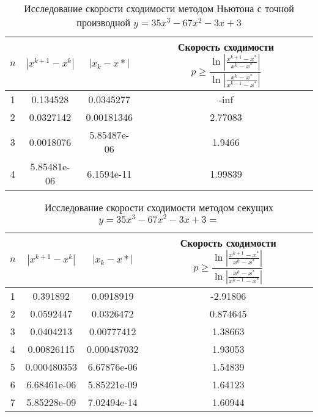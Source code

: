\documentclass{article}
\begin{document}
    \begin{table}[H]
        \centering
        \caption{Исследование скорости сходимости методом Ньютона с точной производной \mbox{$y = 35 x^3 - 67 x^2 -3x+3 $}}
        \begin{tabular}{|c|c|c|c|}
            \hline
            $n$ & $|x^{k+1} - x^k|$ & $ |x_k - x*|$ & Скорость сходимости $p \geqslant \dfrac{\ln | \frac{x^{k+1}-x^*}{x^k - x^*} |}{\ln |\frac{x^k -x^*}{x^{k-1} - x^*}|}$ \\
            \hline 
            1 & 0.134528 & 0.0345277 & -inf \\ \hline
            2 & 0.0327142 & 0.00181346 & 2.77083 \\ \hline
            3 & 0.0018076 & 5.85487e-06 & 1.9466 \\ \hline
            4 & 5.85481e-06 & 6.1594e-11 & 1.99839 \\ \hline
        \end{tabular}
    \end{table}
    \begin{table}[H]
        \centering
        \caption{Исследование скорости сходимости методом секущих \mbox{$y = 35 x^3 - 67 x^2 -3x+3 =$}}
        \begin{tabular}{|c|c|c|c|}
            \hline
            $n$ & $|x^{k+1} - x^k|$ & $ |x_k - x*|$ & Скорость сходимости $p \geqslant \dfrac{\ln | \frac{x^{k+1}-x^*}{x^k - x^*} |}{\ln |\frac{x^k -x^*}{x^{k-1} - x^*}|}$ \\
            \hline 
            1 & 0.391892 & 0.0918919 & -2.91806 \\ \hline
            2 & 0.0592447 & 0.0326472 & 0.874645 \\ \hline
            3 & 0.0404213 & 0.00777412 & 1.38663 \\ \hline
            4 & 0.00826115 & 0.000487032 & 1.93053 \\ \hline
            5 & 0.000480353 & 6.67876e-06 & 1.54839 \\ \hline
            6 & 6.68461e-06 & 5.85221e-09 & 1.64123 \\ \hline
            7 & 5.85228e-09 & 7.02494e-14 & 1.60944 \\ \hline
        \end{tabular}
    \end{table}
\end{document}
